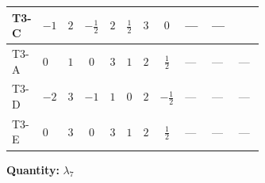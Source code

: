 \documentclass[8pt]{article}
\begin{document}
\begin{landscape}
\begin{longtable}{@{}llcccccc >{\raggedright\arraybackslash}p{0.21\linewidth} >{\raggedright\arraybackslash}p{0.21\linewidth} >{\raggedright\arraybackslash}p{0.21\linewidth}@{}}
\midrule
T3-C & $-1$ & $2$ & $-\frac{1}{2}$ & $2$ & $\frac{1}{2}$ & $3$ & $0$ & --- & --- & \scriptsize\adjustbox{max width=\linewidth}{$\begin{gathered} -2 {\lambda_{H H^\dagger S_1^\dagger S_2^\dagger}^{\rm Cross}} \left({\lambda_5}\right)^{*}\end{gathered}$} \\
\midrule
T3-A & $0$ & $1$ & $0$ & $3$ & $1$ & $2$ & $\frac{1}{2}$ & --- & --- & --- \\
\midrule
T3-D & $-2$ & $3$ & $-1$ & $1$ & $0$ & $2$ & $-\frac{1}{2}$ & --- & --- & --- \\
\midrule
T3-E & $0$ & $3$ & $0$ & $3$ & $1$ & $2$ & $\frac{1}{2}$ & --- & --- & --- \\
\midrule
\bottomrule
\end{longtable}
\clearpage
\noindent\textbf{Quantity: }$\lambda_{7}$\par\smallskip

\end{landscape}
\end{document}
